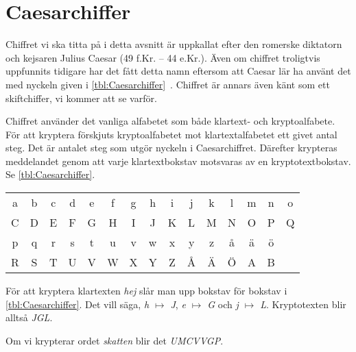 \section{Caesarchiffer}
\label{sec:Caesar}
Chiffret vi ska titta på i detta avsnitt är uppkallat efter den romerske 
diktatorn och kejsaren Julius Caesar (49 f.Kr. -- 44 e.Kr.).
Även om chiffret troligtvis uppfunnits tidigare har det fått detta namn 
eftersom att Caesar lär ha använt det med nyckeln given 
i \cref{tbl:Caesarchiffer}~\cite{Stinson2006cta}.
Chiffret är annars även känt som ett skiftchiffer, vi kommer att se varför.

Chiffret använder det vanliga alfabetet som både klartext- och kryptoalfabete.
För att kryptera förskjuts kryptoalfabetet mot klartextalfabetet ett givet 
antal steg.
Det är antalet steg som utgör nyckeln i Caesarchiffret.
Därefter krypteras meddelandet genom att varje klartextbokstav motsvaras av en 
kryptotextbokstav.
Se \cref{tbl:Caesarchiffer}.

\begin{table*}
  \caption{%
    Tabell för att kryptera med ett Caesarchiffer med nyckeln C.
  }\label{tbl:Caesarchiffer}
	\centering
  \begin{tabular}{ccccccccccccccc}
    \toprule
    a & b & c & d & e & f & g & h & i & j & k & l & m & n & o \\
		C & D & E & F & G & H & I & J & K & L & M & N & O & P & Q \\
    \midrule
    p & q & r & s & t & u & v & w & x & y & z & å & ä & ö \\
		R & S & T & U & V & W & X & Y & Z & Å & Ä & Ö & A & B \\
    \bottomrule
  \end{tabular}
\end{table*}

\begin{example}
  För att kryptera klartexten \emph{hej} slår man upp bokstav för bokstav 
  i \cref{tbl:Caesarchiffer}.
	Det vill säga, \emph{h $\mapsto$ J}, \emph{e $\mapsto$ G} och 
	\emph{j $\mapsto$ L}.
	Kryptotexten blir alltså \emph{JGL}.
\end{example}

\begin{example}\label{ex:CaesarSkatten}
	Om vi krypterar ordet \emph{skatten} blir det \emph{UMCVVGP}.
\end{example}

